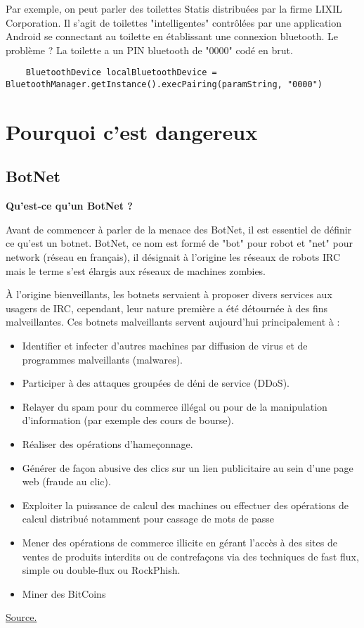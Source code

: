 \documentclass[a4paper]{report}
\begin{document}
	Par exemple, on peut parler des toilettes Statis distribuées par la firme LIXIL Corporation. Il s'agit de toilettes "intelligentes" contrôlées par une application Android se connectant au toilette en établissant une connexion bluetooth. Le problème ? La toilette a un PIN bluetooth de "0000" codé en brut.
	\begin{verbatim}
	BluetoothDevice localBluetoothDevice = BluetoothManager.getInstance().execPairing(paramString, "0000")
	\end{verbatim}
	
	
	\newpage
	
	\section{Pourquoi c'est dangereux}
	\subsection{BotNet}
	
	\bigbreak	
	
	\begin{flushleft}
		\textbf{Qu'est-ce qu'un BotNet ?} \\
	\end{flushleft}
	
	Avant de commencer à parler de la menace des BotNet, il est essentiel de définir ce qu'est un botnet.
	BotNet, ce nom est formé de "bot" pour robot et "net" pour network (réseau en français), il désignait à l'origine les réseaux de robots
	IRC mais le terme s'est élargis aux réseaux de machines zombies.
	
	\bigbreak
	
	À l'origine bienveillants, les botnets servaient à proposer divers services aux usagers de IRC, cependant, leur nature première a été 
	détournée à des fins malveillantes. Ces botnets malveillants servent aujourd'hui principalement à :
	\begin{itemize}
		\item Identifier et infecter d’autres machines par diffusion de virus et de programmes malveillants (malwares).
		\item Participer à des attaques groupées de déni de service (DDoS).
		\item Relayer du spam pour du commerce illégal ou pour de la manipulation d'information (par exemple des cours de bourse).
		\item Réaliser des opérations d'hameçonnage.
		\item Générer de façon abusive des clics sur un lien publicitaire au sein d’une page web (fraude au clic).
		\item Exploiter la puissance de calcul des machines ou effectuer des opérations de calcul distribué notamment pour cassage de mots 
		de passe
		\item Mener des opérations de commerce illicite en gérant l'accès à des sites de ventes de produits interdits ou de contrefaçons 
		via des techniques de fast flux, simple ou double-flux ou RockPhish.
		\item Miner des BitCoins
	\end{itemize}
	\href{https://fr.wikipedia.org/wiki/Botnet#Usages_des_botnets}{Source.}
	\bigbreak
		
\end{document}
